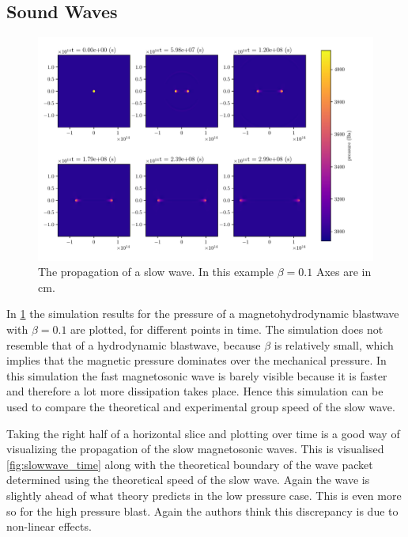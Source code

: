 \documentclass[a4paper]{article}
\numberwithin{figure}{section}
\numberwithin{equation}{section}
\begin{document}
\subsection{Sound Waves}
\begin{figure}[H]
	\centering
	\includegraphics[width=\textwidth]{figures/slow_wave.pdf}
	\caption{The propagation of a slow wave. In this example $\beta = 0.1$ Axes are in \si{cm}.}
	\label{fig:Alfven_wave}
\end{figure}


In \cref{fig:Alfven_wave} the simulation results for the pressure of a magnetohydrodynamic blastwave with $\beta = 0.1$ are plotted, for different points in time. 
The simulation does not resemble that of a hydrodynamic blastwave, because $\beta$ is relatively small, which implies that the magnetic pressure dominates over the mechanical pressure.
In this simulation the fast magnetosonic wave is barely visible because it is faster and therefore a lot more dissipation takes place. 
Hence this simulation can be used to compare the theoretical and 
experimental group speed of the slow wave.

Taking the right half of a horizontal slice and plotting over time is a good way of visualizing the propagation of the slow magnetosonic waves. This is visualised \cref{fig:slowwave_time} along with the theoretical boundary of the wave packet determined using the theoretical speed of the slow wave.  
Again the wave is slightly ahead of what theory predicts in the low pressure case. This is even more so for the high pressure blast. Again the authors think this discrepancy is due to non-linear effects.
\end{document}
